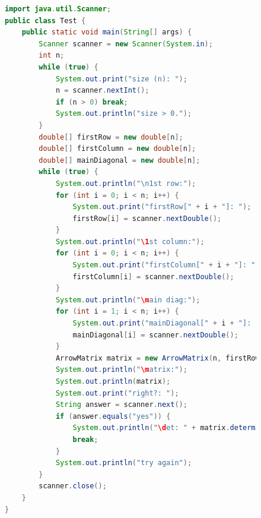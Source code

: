 \documentclass[a4paper, 14pt]{extarticle}
\begin{document}
\begin{figure}[!htb]
\begin{lstlisting}[language={java},caption={Файл Test.java},label={lst:code2}]
import java.util.Scanner;
public class Test {
    public static void main(String[] args) {
        Scanner scanner = new Scanner(System.in);
        int n;
        while (true) {
            System.out.print("size (n): ");
            n = scanner.nextInt();
            if (n > 0) break;
            System.out.println("size > 0.");
        }
        double[] firstRow = new double[n];
        double[] firstColumn = new double[n];
        double[] mainDiagonal = new double[n];
        while (true) {
            System.out.println("\n1st row:");
            for (int i = 0; i < n; i++) {
                System.out.print("firstRow[" + i + "]: ");
                firstRow[i] = scanner.nextDouble();
            }
            System.out.println("\1st column:");
            for (int i = 0; i < n; i++) {
                System.out.print("firstColumn[" + i + "]: ");
                firstColumn[i] = scanner.nextDouble();
            }
            System.out.println("\main diag:");
            for (int i = 1; i < n; i++) {
                System.out.print("mainDiagonal[" + i + "]: ");
                mainDiagonal[i] = scanner.nextDouble();
            }
            ArrowMatrix matrix = new ArrowMatrix(n, firstRow, firstColumn, mainDiagonal);
            System.out.println("\matrix:");
            System.out.println(matrix);
            System.out.print("right?: ");
            String answer = scanner.next();
            if (answer.equals("yes")) {
                System.out.println("\det: " + matrix.determinant());
                break;
            }
            System.out.println("try again");
        }
        scanner.close();
    }
}


\end{lstlisting}
\end{figure}
\end{document}
